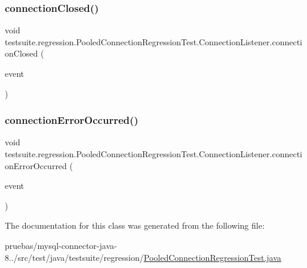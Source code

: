 \subsubsection{\texorpdfstring{connection\+Closed()}{connectionClosed()}}
{\footnotesize\ttfamily void testsuite.\+regression.\+Pooled\+Connection\+Regression\+Test.\+Connection\+Listener.\+connection\+Closed (\begin{DoxyParamCaption}\item[{Connection\+Event}]{event }\end{DoxyParamCaption})}

\mbox{\label{classtestsuite_1_1regression_1_1_pooled_connection_regression_test_1_1_connection_listener_ad64bb73a2b6c66d5608528771c7f014a}} 
\subsubsection{\texorpdfstring{connection\+Error\+Occurred()}{connectionErrorOccurred()}}
{\footnotesize\ttfamily void testsuite.\+regression.\+Pooled\+Connection\+Regression\+Test.\+Connection\+Listener.\+connection\+Error\+Occurred (\begin{DoxyParamCaption}\item[{Connection\+Event}]{event }\end{DoxyParamCaption})}



The documentation for this class was generated from the following file\+:\begin{DoxyCompactItemize}
\item 
pruebas/mysql-\/connector-\/java-\/8../src/test/java/testsuite/regression/\mbox{\hyperlink{_pooled_connection_regression_test_8java}{Pooled\+Connection\+Regression\+Test.\+java}}\end{DoxyCompactItemize}
